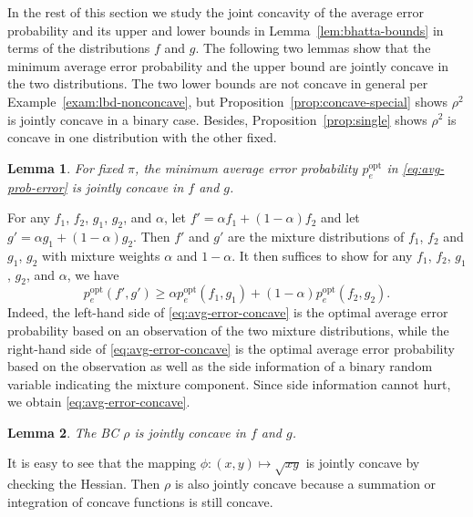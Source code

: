 \documentclass[conference,letterpaper]{IEEEtran}
\newtheorem{lemma}{Lemma}
\newcommand{\distA}{f}%
\newcommand{\distB}{g}%
\newcommand{\errorOpt}{p_e^{\mathrm{opt}}}
\begin{document}
{In the rest of this section we study the joint concavity of the
average error probability and its upper and lower bounds in
Lemma~\ref{lem:bhatta-bounds} in terms of the distributions $\distA$
and $\distB$.  The following two lemmas show that the minimum average
error probability and the upper bound are jointly concave in the two
distributions.  The two lower bounds are not concave in general per
Example~\ref{exam:lbd-nonconcave}, but
Proposition~\ref{prop:concave-special} shows $\rho^2$ is jointly
concave in a binary case.  Besides, Proposition~\ref{prop:single}
shows $\rho^2$ is concave in one distribution with the other fixed.

\begin{lemma}
  \label{lem:concave-error}
  For fixed $\pi$, the minimum average error probability $\errorOpt$
  in \eqref{eq:avg-prob-error} is jointly concave in $f$ and $g$.
\end{lemma}
\begin{IEEEproof}
  For any $f_1$, $f_2$, $g_1$, $g_2$, and $\alpha$, let
  $f' = \alpha f_1 + (1-\alpha)f_2$ and let
  $g' = \alpha g_1 + (1-\alpha)g_2$.  Then $f'$ and $g'$ are the
  mixture distributions of $f_1$, $f_2$ and $g_1$, $g_2$ with mixture
  weights $\alpha$ and $1-\alpha$.  It then suffices to show for any
  $f_1$, $f_2$, $g_1$, $g_2$, and $\alpha$, we have
  \begin{equation}
    \label{eq:avg-error-concave}
    \errorOpt(f', g') \ge \alpha \errorOpt(f_1, g_1) + (1-\alpha)\errorOpt(f_2, g_2).
  \end{equation}
  Indeed, the left-hand side of \eqref{eq:avg-error-concave} is the
  optimal average error probability based on an observation of the two
  mixture distributions, while the right-hand side of
  \eqref{eq:avg-error-concave} is the optimal average error
  probability based on the observation as well as the side information
  of a binary random variable indicating the mixture component.  Since
  side information cannot hurt, we obtain
  \eqref{eq:avg-error-concave}.
\end{IEEEproof}
\begin{lemma}
  \label{lem:rho-concave}
  The BC $\rho$ is jointly concave in $f$ and $g$.
\end{lemma}
\begin{IEEEproof}
  It is easy to see that the mapping
  $\phi\colon(x, y)\mapsto\sqrt{xy}$ is jointly concave by checking
  the Hessian.  Then $\rho$ is also jointly concave because a
  summation or integration of concave functions is still concave.
\end{IEEEproof}

}
\end{document}
